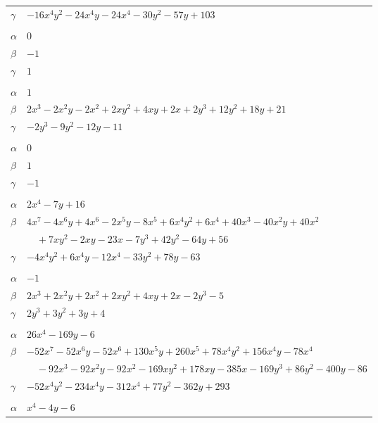 \documentclass[11pt]{article}
\begin{document}
\begin{longtable}{@{}ll@{}}
$\gamma$ & $-16x^{4}y^{2}-24x^{4}y-24x^{4}-30y^{2}-57y+103$\\
\addlinespace[3pt]
\multicolumn{2}{@{}l}{$\{i,j\}=\{6,7\}$, $k_{ij}=2$}\\
$\alpha$ & $0$\\
$\beta$ & $-1$\\
$\gamma$ & $1$\\
\addlinespace[3pt]
\multicolumn{2}{@{}l}{$\{i,j\}=\{6,13\}$, $k_{ij}=2$}\\
$\alpha$ & $1$\\
$\beta$ & $2x^{3}-2x^{2}y-2x^{2}+2xy^{2}+4xy+2x+2y^{3}+12y^{2}+18y+21$\\
$\gamma$ & $-2y^{3}-9y^{2}-12y-11$\\
\addlinespace[3pt]
\multicolumn{2}{@{}l}{$\{i,j\}=\{6,35\}$, $k_{ij}=1$}\\
$\alpha$ & $0$\\
$\beta$ & $1$\\
$\gamma$ & $-1$\\
\addlinespace[3pt]
\multicolumn{2}{@{}l}{$\{i,j\}=\{7,17\}$, $k_{ij}=2^{3}\cdot 3^{2}$}\\
$\alpha$ & $2x^{4}-7y+16$\\
$\beta$ & $4x^{7}-4x^{6}y+4x^{6}-2x^{5}y-8x^{5}+6x^{4}y^{2}+6x^{4}+40x^{3}-40x^{2}y+40x^{2}$\\
 & $\quad +7xy^{2}-2xy-23x-7y^{3}+42y^{2}-64y+56$\\
$\gamma$ & $-4x^{4}y^{2}+6x^{4}y-12x^{4}-33y^{2}+78y-63$\\
\addlinespace[3pt]
\multicolumn{2}{@{}l}{$\{i,j\}=\{9,12\}$, $k_{ij}=2^{3}$}\\
$\alpha$ & $-1$\\
$\beta$ & $2x^{3}+2x^{2}y+2x^{2}+2xy^{2}+4xy+2x-2y^{3}-5$\\
$\gamma$ & $2y^{3}+3y^{2}+3y+4$\\
\addlinespace[3pt]
\multicolumn{2}{@{}l}{$\{i,j\}=\{9,17\}$, $k_{ij}=2^{4}\cdot 5$}\\
$\alpha$ & $26x^{4}-169y-6$\\
$\beta$ & $-52x^{7}-52x^{6}y-52x^{6}+130x^{5}y+260x^{5}+78x^{4}y^{2}+156x^{4}y-78x^{4}$\\
 & $\quad -92x^{3}-92x^{2}y-92x^{2}-169xy^{2}+178xy-385x-169y^{3}+86y^{2}-400y-86$\\
$\gamma$ & $-52x^{4}y^{2}-234x^{4}y-312x^{4}+77y^{2}-362y+293$\\
\addlinespace[3pt]
\multicolumn{2}{@{}l}{$\{i,j\}=\{9,24\}$, $k_{ij}=2^{3}$}\\
$\alpha$ & $x^{4}-4y-6$\\

\end{longtable}
\end{document}
